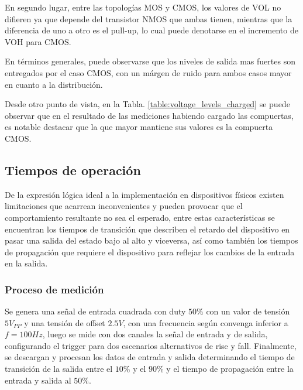 En segundo lugar, entre las topolog\'ias MOS y CMOS, los valores de VOL no difieren ya que depende del transistor NMOS que ambas tienen,
mientras que la diferencia de uno a otro es el pull-up, lo cual puede denotarse en el incremento de VOH para CMOS.

En t\'erminos generales, puede observarse que los niveles de salida mas fuertes son entregados por el caso CMOS, con un m\'argen de ruido para ambos casos mayor en cuanto a la distribuci\'on.


Desde otro punto de vista, en la Tabla. \ref{table:voltage_levels_charged} se puede observar que en el resultado de las mediciones habiendo cargado las compuertas, es notable destacar que la que mayor mantiene sus valores
es la compuerta CMOS.

\subsection{Tiempos de operaci\'on}
De la expresi\'on l\'ogica ideal a la implementaci\'on en dispositivos f\'isicos existen limitaciones que acarrean inconvenientes y pueden provocar que el comportamiento
resultante no sea el esperado, entre estas caracter\'isticas se encuentran los tiempos de transici\'on que describen el retardo del dispositivo en pasar una salida del estado bajo al alto y viceversa, as\'i como tambi\'en los tiempos
de propagaci\'on que requiere el dispositivo para reflejar los cambios de la entrada en la salida.

\subsubsection{Proceso de medici\'on}
Se genera una se\~nal de entrada cuadrada con duty $50\%$ con un valor de tensi\'on $5 V_{PP}$ y una tensi\'on de offset $2.5V$, con una frecuencia seg\'un convenga inferior a $f= 100Hz$, luego se mide con dos canales
la se\~nal de entrada y de salida, configurando el trigger para dos escenarios alternativos de rise y fall.
Finalmente, se descargan y procesan los datos de entrada y salida determinando el tiempo de transici\'on de la salida entre el $10\%$ y el $90\%$ y el tiempo de propagaci\'on entre la entrada y salida al $50\%$.


